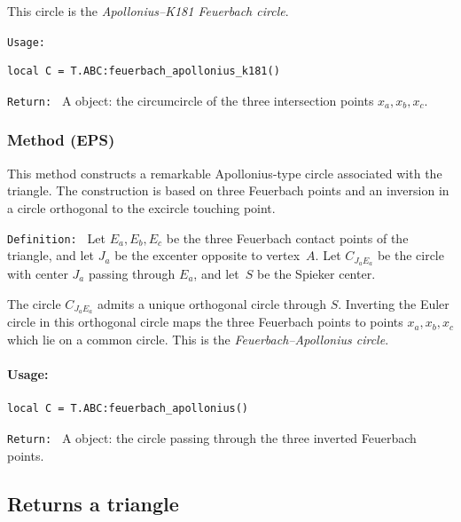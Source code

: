 This circle is the \emph{Apollonius--K181 Feuerbach circle}.

\texttt{Usage: }

\begin{verbatim}
local C = T.ABC:feuerbach_apollonius_k181()
\end{verbatim}

\texttt{Return: }
A  object: the circumcircle of the three intersection points
$x_a,x_b,x_c$.



\subsubsection{Method (EPS)}
\label{ssub:feuerbach_apollonius}

This method constructs a remarkable Apollonius-type circle associated with the
triangle.
The construction is based on three Feuerbach points and an inversion in a
circle orthogonal to the excircle touching point.

\texttt{Definition: }
Let $E_a,E_b,E_c$ be the three Feuerbach contact points of the triangle, and
let $J_a$ be the excenter opposite to vertex~$A$.
Let $C_{J_aE_a}$ be the circle with center $J_a$ passing through $E_a$, and
let~$S$ be the Spieker center.

The circle $C_{J_aE_a}$ admits a unique orthogonal circle through $S$.
Inverting the Euler circle in this orthogonal circle maps the three Feuerbach
points to points $x_a,x_b,x_c$ which lie on a common circle.
This is the \emph{Feuerbach--Apollonius circle}.

\paragraph{Usage: }

\begin{verbatim}
local C = T.ABC:feuerbach_apollonius()
\end{verbatim}

\texttt{Return: }
A  object: the circle passing through the three inverted
Feuerbach points.





\subsection{Returns  a triangle}
